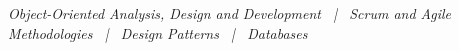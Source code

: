 %
\emph{Object-Oriented Analysis, Design and Development \ | \ Scrum and Agile Methodologies \ | \ Design Patterns \ | \ Databases}
